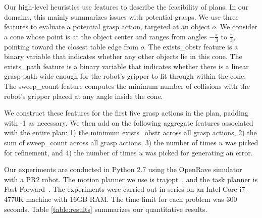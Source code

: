 Our high-level heuristics use features to describe the feasibility of
plans. In our domains, this mainly summarizes issues with potential
grasps. We use three features to evaluate a potential grasp action,
targeted at an object $o$. We consider a cone whose point is at the
object center and ranges from angles $-\frac{\pi}{3}$ to
$\frac{\pi}{3}$, pointing toward the closest table edge from $o$. The
exists\_obstr feature is a binary variable that indicates whether any
other objects lie in this cone. The exists\_path feature is a binary
variable that indicates whether there is a linear grasp path wide
enough for the robot's gripper to fit through within the cone. The
sweep\_count feature computes the minimum number of collisions with the robot's
gripper placed at any angle inside the cone.

We construct these features for the first five grasp actions in the
plan, padding with -1 as necessary. We then add on the following
aggregate features associated with the entire plan: 1) the minimum
exists\_obstr across all grasp actions, 2) the sum of sweep\_count
across all grasp actions, 3) the number of times $u$ was picked for
refinement, and 4) the number of times $u$ was picked for generating
an error.

Our experiments are conducted in Python 2.7 using the OpenRave
simulator~\cite{Diankov_2008_6117} with a PR2 robot.  The motion
planner we use is trajopt~\cite{schulman2013finding}, and the task
planner is Fast-Forward~\cite{FF}.  The experiments were carried out
in series on an Intel Core i7-4770K machine with 16GB RAM. The time limit
for each problem was 300 seconds. Table
\ref{table:results} summarizes our quantitative results.


